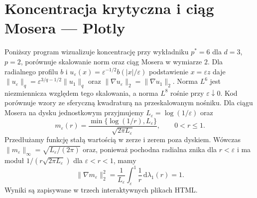 \section{Koncentracja krytyczna i ciąg Mosera — Plotly}
Poniższy program wizualizuje koncentrację przy wykładniku
$p^*=6$ dla $d=3$, $p=2$, porównuje skalowanie norm
oraz ciąg Mosera w wymiarze $2$.
Dla radialnego profilu $b$ i
$u_\varepsilon(x)=\varepsilon^{-1/2}b(|x|/\varepsilon)$
podstawienie $x=\varepsilon z$ daje
$\|u_\varepsilon\|_q=\varepsilon^{3/q-1/2}\|u_1\|_q$
oraz $\|\nabla u_\varepsilon\|_2=\|\nabla u_1\|_2$.
Norma $L^6$ jest niezmiennicza względem tego skalowania,
a norma $L^8$ rośnie przy $\varepsilon\downarrow0$.
Kod porównuje wzory ze sferyczną kwadraturą
na przeskalowanym nośniku.
Dla ciągu Mosera na dysku jednostkowym
przyjmujemy $L_\varepsilon=\log(1/\varepsilon)$ oraz
\[
 m_\varepsilon(r)=
 \frac{\min\{\log(1/r),L_\varepsilon\}}
 {\sqrt{2\pi L_\varepsilon}},\qquad 0<r\le1 .
\]
Przedłużamy funkcję stałą wartością w zerze
i zerem poza dyskiem. Wówczas
$\|m_\varepsilon\|_\infty=\sqrt{L_\varepsilon/(2\pi)}$
oraz, ponieważ pochodna radialna znika dla
$r<\varepsilon$ i ma moduł
$1/(r\sqrt{2\pi L_\varepsilon})$ dla
$\varepsilon<r<1$, mamy
\[
 \|\nabla m_\varepsilon\|_2^2
 =\frac1{L_\varepsilon}
 \int_\varepsilon^1\frac1r\,\mathrm d\lambda_1(r)=1.
\]
Wyniki są zapisywane w trzech interaktywnych plikach HTML.
